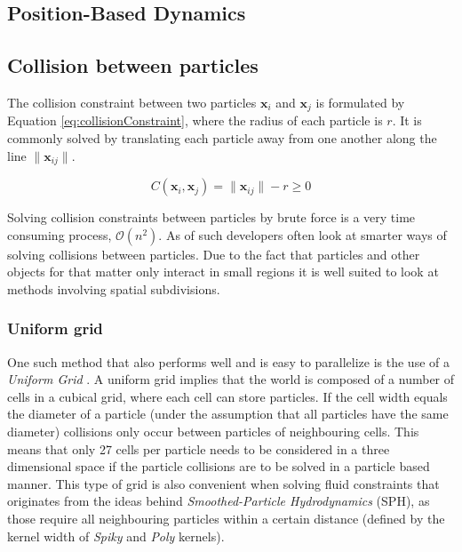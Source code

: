 \subsection{Position-Based Dynamics}


\subsection{Collision between particles}

The collision constraint between two particles $ \mathbf{x}_{i} $ and $ \mathbf{x}_{j} $ is formulated by Equation \ref{eq:collisionConstraint}, where the radius of each particle is $ r $. It is commonly solved by translating each particle away from one another along the line $ \| \mathbf{x}_{ij} \| $.

\begin{equation} \label{eq:collisionConstraint}
  C(\mathbf{x}_{i}, \mathbf{x}_{j}) = \| \mathbf{x}_{ij} \| - r \geq 0
\end{equation}

Solving collision constraints between particles by brute force is a very time consuming process, $\mathcal{O}(n^{2})$. As of such developers often look at smarter ways of solving collisions between particles. Due to the fact that particles and other objects for that matter only interact in small regions it is well suited to look at methods involving spatial subdivisions.

\subsubsection{Uniform grid}

One such method that also performs well and is easy to parallelize is the use of a \textit{Uniform Grid} \cite{Green}. A uniform grid implies that the world is composed of a number of cells in a cubical grid, where each cell can store particles. If the cell width equals the diameter of a particle (under the assumption that all particles have the same diameter) collisions only occur between particles of neighbouring cells. This means that only 27 cells per particle needs to be considered in a three dimensional space if the particle collisions are to be solved in a particle based manner. This type of grid is also convenient when solving fluid constraints that originates from the ideas behind \textit{Smoothed-Particle Hydrodynamics} (SPH), as those require all neighbouring particles within a certain distance (defined by the kernel width of \textit{Spiky} and \textit{Poly} kernels).

